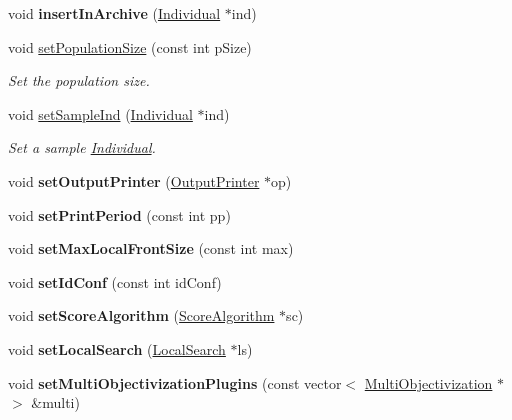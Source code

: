 \begin{DoxyCompactItemize}
\mbox{\label{classEA_a208ac74dea2eaa42e17c19f5e32d644d}} 
void {\bfseries insert\+In\+Archive} (\mbox{\hyperlink{classIndividual}{Individual}} $\ast$ind)
\item 
void \mbox{\hyperlink{classEA_afb4678f700cb03d64dc60fc3d24f7a1f}{set\+Population\+Size}} (const int p\+Size)
\begin{DoxyCompactList}\small\item\em Set the population size. \end{DoxyCompactList}\item 
void \mbox{\hyperlink{classEA_add9a924cd307b2a49b1cf961c65e8ef2}{set\+Sample\+Ind}} (\mbox{\hyperlink{classIndividual}{Individual}} $\ast$ind)
\begin{DoxyCompactList}\small\item\em Set a sample \mbox{\hyperlink{classIndividual}{Individual}}. \end{DoxyCompactList}\item 
\mbox{\label{classEA_a49a75271ab62ffdb59d7a5fbbc97f998}} 
void {\bfseries set\+Output\+Printer} (\mbox{\hyperlink{classOutputPrinter}{Output\+Printer}} $\ast$op)
\item 
\mbox{\label{classEA_a161b549d8ec90da1bd07687f6b388b59}} 
void {\bfseries set\+Print\+Period} (const int pp)
\item 
\mbox{\label{classEA_a114980c167652af030f11349810797e9}} 
void {\bfseries set\+Max\+Local\+Front\+Size} (const int max)
\item 
\mbox{\label{classEA_a2a66dc69d7f1c185f9f177f3a3913898}} 
void {\bfseries set\+Id\+Conf} (const int id\+Conf)
\item 
\mbox{\label{classEA_a2140dd732a9acc2ce6044669e60bb335}} 
void {\bfseries set\+Score\+Algorithm} (\mbox{\hyperlink{classScoreAlgorithm}{Score\+Algorithm}} $\ast$sc)
\item 
\mbox{\label{classEA_a7331ed1b01abe48b170068abbde388be}} 
void {\bfseries set\+Local\+Search} (\mbox{\hyperlink{classLocalSearch}{Local\+Search}} $\ast$ls)
\item 
\mbox{\label{classEA_a73cb790a9ba0a552096613522c13d6cf}} 
void {\bfseries set\+Multi\+Objectivization\+Plugins} (const vector$<$ \mbox{\hyperlink{classMultiObjectivization}{Multi\+Objectivization}} $\ast$$>$ \&multi)
$$
\end{DoxyCompactItemize}
